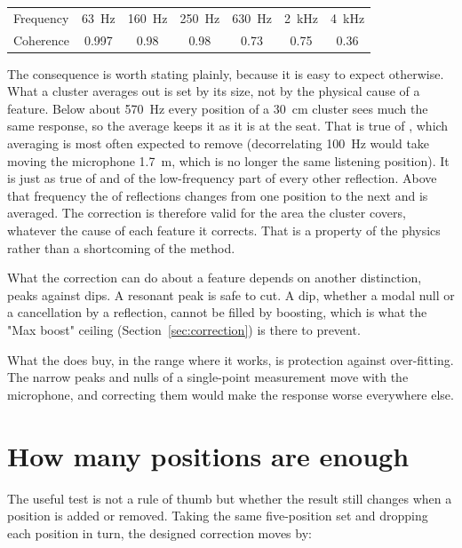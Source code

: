 \begin{center}
\begin{tabular}{lcccccc}
\toprule
Frequency & \SI{63}{\hertz} & \SI{160}{\hertz} & \SI{250}{\hertz}
          & \SI{630}{\hertz} & \SI{2}{\kilo\hertz} & \SI{4}{\kilo\hertz}\\
Coherence & 0.997 & 0.98 & 0.98 & 0.73 & 0.75 & 0.36\\
\bottomrule
\end{tabular}
\end{center}

\noindent The consequence is worth stating plainly, because it is easy to expect otherwise. What a cluster averages out is set by its size, not by the physical cause of a feature. Below about \SI{570}{\hertz} every position of a \SI{30}{\centi\metre} cluster sees much the same response, so the average keeps it as it is at the seat. That is true of , which averaging is most often expected to remove (decorrelating \SI{100}{\hertz} would take moving the microphone \SI{1.7}{\metre}, which is no longer the same listening position). It is just as true of  and of the low-frequency part of every other reflection. Above that frequency the  of reflections changes from one position to the next and is averaged. The correction is therefore valid for the area the cluster covers, whatever the cause of each feature it corrects. That is a property of the physics rather than a shortcoming of the method.

What the correction can do about a feature depends on another distinction, peaks against dips. A resonant peak is safe to cut. A dip, whether a modal null or a cancellation by a reflection, cannot be filled by boosting, which is what the "Max boost" ceiling (Section~\ref{sec:correction}) is there to prevent.

What the  does buy, in the range where it works, is protection against over-fitting. The narrow peaks and nulls of a single-point measurement move with the microphone, and correcting them would make the response worse everywhere else.

\section{How many positions are enough}
The useful test is not a rule of thumb but whether the result still changes when a position is added or removed. Taking the same five-position set and dropping each position in turn, the designed correction moves by:

